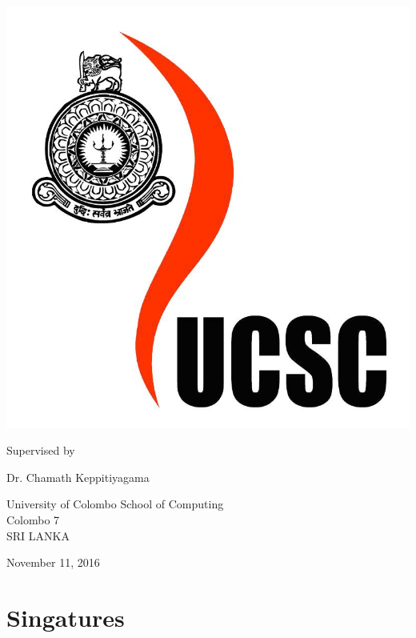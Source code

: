 \documentclass[11pt]{article}
\numberwithin{figure}{section}
\numberwithin{table}{section}
\begin{document}
\begin{titlepage}
	\includegraphics[scale=0.1]{ucsc.png}
	
	\vfill    
	
	{Supervised by}
	
	\vspace*{0.3\baselineskip}
	
	{\Large Dr. Chamath Keppitiyagama}
	

	
	\vspace*{0.5\baselineskip}
	
	
	
	\vfill
	
	{University of Colombo School of Computing\\
		Colombo 7\\
		SRI LANKA}
	
	\vfill
	{November 11, 2016}
	


\end{titlepage}
\section*{Singatures}
\end{document}
